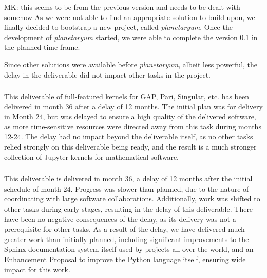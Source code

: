 \begin{oldpart}{MK: this seems to be from the previous version and needs to be dealt with somehow}
As we were not able to find an appropriate solution to build upon, we
finally decided to bootstrap a new project, called
\emph{planetaryum}. Once the development of \emph{planetaryum}
started, we were able to complete the version 0.1 in the planned
time frame.

Since other solutions were available before \emph{planetaryum}, albeit
less powerful, the delay in the deliverable did not impact other tasks
in the project.


\subsubsection{\protect{}}

This deliverable of full-featured kernels for GAP, Pari, Singular, etc.  has been
delivered in month 36 after a delay of 12 months.  The initial plan was for delivery in
Month 24, but was delayed to ensure a high quality of the delivered software, as more
time-sensitive resources were directed away from this task during months 12-24.  The delay
had no impact beyond the deliverable itself, as no other tasks relied strongly on this
deliverable being ready, and the result is a much stronger collection of Jupyter kernels
for mathematical software.

\subsubsection{\protect{}}

This deliverable is delivered in month 36, a delay of 12 months after the initial schedule
of month 24.  Progress was slower than planned, due to the nature of coordinating with
large software collaborations.  Additionally, work was shifted to other tasks during early
stages, resulting in the delay of this deliverable.  There have been no negative
consequences of the delay, as its delivery was not a prerequisite for other tasks.  As a
result of the delay, we have delivered much greater work than initially planned, including
significant improvements to the Sphinx documentation system itself used by projects all
over the world, and an Enhancement Proposal to improve the Python language itself,
ensuring wide impact for this work.



\end{oldpart}

